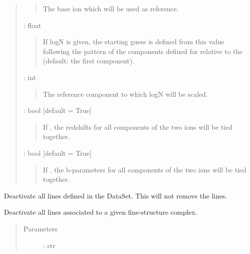 \documentclass[letterpaper,10pt,english]{sphinxmanual}
\begin{document}
\begin{fulllineitems}
\begin{fulllineitems}
\begin{quote}
\begin{description}
\begin{quote}
The base ion which will be used as reference.
\end{quote}

 : float
\begin{quote}

If logN is given, the starting guess is defined from this value
following the pattern of the components defined for  relative to the
 (default: the first component).
\end{quote}

 : int
\begin{quote}

The reference component to which logN will be scaled.
\end{quote}

 : bool   {[}default = True{]}
\begin{quote}

If , the redshifts for all components of the two ions will be tied together.
\end{quote}

 : bool   {[}default = True{]}
\begin{quote}

If , the b-parameters for all components of the two ions will be tied together.
\end{quote}

\end{description}\end{quote}

\end{fulllineitems}


\begin{fulllineitems}
\label{\detokenize{api:VoigtFit.DataSet.deactivate_all}}
Deactivate all lines defined in the DataSet. This will not remove the lines.

\end{fulllineitems}


\begin{fulllineitems}
\label{\detokenize{api:VoigtFit.DataSet.deactivate_fine_lines}}
Deactivate all lines associated to a given fine-structure complex.
\begin{quote}\begin{description}
\item[{Parameters}] \leavevmode
{} : str
\begin{quote}


\end{quote}
\end{description}
\end{quote}
\end{fulllineitems}
\end{fulllineitems}
\end{document}
